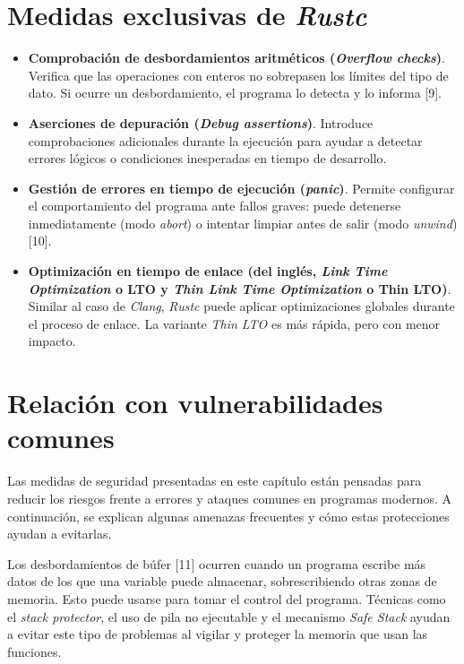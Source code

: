 \section{Medidas exclusivas de \emph{Rustc}}

\begin{itemize}
\item
  \textbf{Comprobación de desbordamientos aritméticos (\emph{Overflow checks})}.
  Verifica que las operaciones con enteros no sobrepasen los límites del
  tipo de dato. Si ocurre un desbordamiento, el programa lo detecta y lo
  informa [9].
\item
  \textbf{Aserciones de depuración (\emph{Debug assertions})}.
  Introduce comprobaciones adicionales durante la ejecución para ayudar
  a detectar errores lógicos o condiciones inesperadas en tiempo de
  desarrollo.
\item
  \textbf{Gestión de errores en tiempo de ejecución (\emph{panic})}.
  Permite configurar el comportamiento del programa ante fallos graves:
  puede detenerse inmediatamente (modo \emph{abort}) o intentar limpiar
  antes de salir (modo \emph{unwind}) [10].
\item
  \textbf{Optimización en tiempo de enlace (del inglés, \emph{Link Time Optimization} o LTO y \emph{Thin Link Time Optimization} o Thin LTO)}.
  Similar al caso de \emph{Clang}, \emph{Rustc} puede aplicar optimizaciones
  globales durante el proceso de enlace. La variante \emph{Thin LTO} es
  más rápida, pero con menor impacto.
\end{itemize}

\section{Relación con vulnerabilidades comunes}

Las medidas de seguridad presentadas en este capítulo están pensadas para reducir los riesgos frente a errores y ataques comunes en programas modernos. A continuación, se explican algunas amenazas frecuentes y cómo estas protecciones ayudan a evitarlas.

Los desbordamientos de búfer [11] ocurren cuando un programa escribe más datos de los que una variable puede almacenar, sobrescribiendo otras zonas de memoria. Esto puede usarse para tomar el control del programa. Técnicas como el \emph{stack protector}, el uso de pila no ejecutable y el mecanismo \emph{Safe Stack} ayudan a evitar este tipo de problemas al vigilar y proteger la memoria que usan las funciones.

